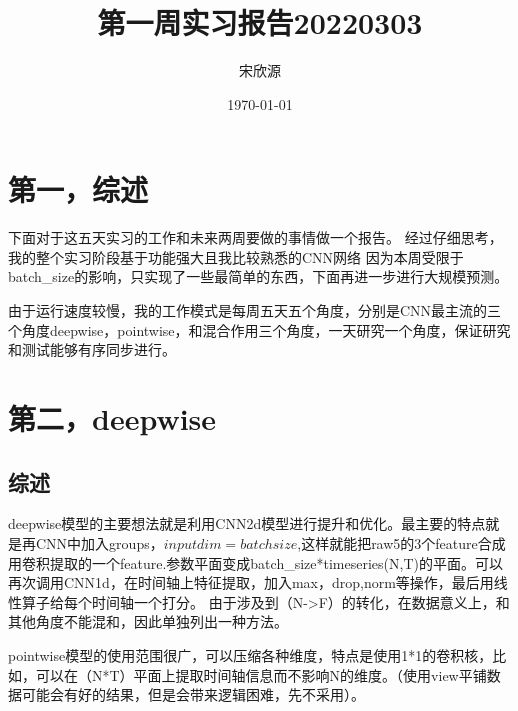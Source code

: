 \documentclass[11pt]{ctexart}
\begin{document}
\title{第一周实习报告20220303}
\author{宋欣源}
\date{\today}

\maketitle %


\section{第一，综述}

下面对于这五天实习的工作和未来两周要做的事情做一个报告。
经过仔细思考，我的整个实习阶段基于功能强大且我比较熟悉的CNN网络
因为本周受限于batch\_size的影响，只实现了一些最简单的东西，下面再进一步进行大规模预测。

由于运行速度较慢，我的工作模式是每周五天五个角度，分别是CNN最主流的三个角度deepwise，pointwise，和混合作用三个角度，一天研究一个角度，保证研究和测试能够有序同步进行。

\section{第二，deepwise}
\subsection{综述}

deepwise模型的主要想法就是利用CNN2d模型进行提升和优化。最主要的特点就是再CNN中加入groups，$input dim = batch size$,这样就能把raw5的3个feature合成用卷积提取的一个feature.参数平面变成batch\_size*timeseries(N,T)的平面。可以再次调用CNN1d，在时间轴上特征提取，加入max，drop,norm等操作，最后用线性算子给每个时间轴一个打分。
由于涉及到（N->F）的转化，在数据意义上，和其他角度不能混和，因此单独列出一种方法。

pointwise模型的使用范围很广，可以压缩各种维度，特点是使用1*1的卷积核，比如，可以在（N*T）平面上提取时间轴信息而不影响N的维度。（使用view平铺数据可能会有好的结果，但是会带来逻辑困难，先不采用）。
\end{document}
